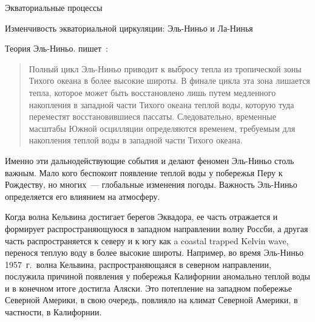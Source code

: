 \begin{chapter}{Экваториальные процессы}
\begin{section}{Изменчивость экваториальной циркуляции: Эль-Ниньо и Ла-Нинья}
\begin{paragraph}{Теория Эль-Ниньо.}
пишет~\cite{Wyrtki:1985}:
%
%
\begin{quote}
Полный цикл Эль-Ниньо приводит к выбросу тепла из тропической зоны Тихого 
океана в более высокие широты. В финале цикла эта зона лишается тепла,
которое может быть восстановлено лишь путем медленного накопления в западной 
части Тихого океана теплой воды, которую туда переместят восстановившиеся 
пассаты. Следовательно, временные масштабы Южной осцилляции определяются 
временем, требуемым для накопления теплой воды в западной части Тихого океана.
%
\end{quote}

Именно эти дальнодействующие события и делают феномен Эль-Ниньо столь важным.
Мало кого беспокоит появление теплой воды у побережья Перу к Рождеству,
но многих~--- глобальные изменения погоды. Важность Эль-Ниньо определяется
его влиянием на атмосферу.
%

Когда волна Кельвина достигает берегов Эквадора,
ее часть отражается и формирует распространяющуюся в западном направлении
волну Россби, а другая часть распространяется к северу
и к югу как a coastal trapped Kelvin wave, перенося теплую воду в более 
высокие широты. Например, во время Эль-Ниньо 1957~г.\ волна Кельвина,
распространяющаяся в северном направлении, послужила причиной появления
у побережья Калифорнии аномально теплой воды и в конечном итоге достигла 
Аляски.
Это потепление на западном побережье Северной Америки, в свою очередь,
повлияло на климат Северной Америки, в частности, в Калифорнии.
%


\end{paragraph}
\end{section}
\end{chapter}

